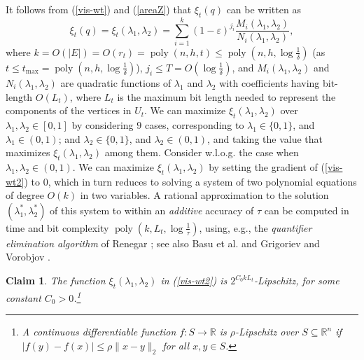 \documentclass[a4paper,11pt]{article}
\newtheorem{claim}[theorem]{Claim}
\def\RR{\mathbb R}
\def\eps{\varepsilon}
\newcommand{\raf}[1]{(\ref{#1})}
\newcommand{\poly}{\operatorname{poly}}
\begin{document}
It follows from \raf{vis-wt} and \raf{areaZ} that $\xi_t(q)$ can be written as     \begin{equation}\label{vis-wt2}                                                                                             \xi_t(q)=\xi_t(\lambda_1,\lambda_2)=\sum_{i=1}^k(1-\eps)^{j_i}\frac{M_i(\lambda_1,\lambda_2)}{N_i(\lambda_1,\lambda_2)},
\end{equation}     
where
$k=O(|E|)=O(r_t)=\poly(n,h,t)\le\poly(n,h,\log\frac{1}{\delta})$ (as $t\le t_{\max}=\poly(n,h,\log\frac{1}{\delta})$), $j_i\le T=O(\log\frac1\delta)$, and $M_i(\lambda_1,\lambda_2)$ and $N_i(\lambda_1,\lambda_2)$ are quadratic functions of $\lambda_1$ and $\lambda_2$ with coefficients having bit-length $O(L_t)$, where $L_t$ is the maximum bit length needed to represent the components of the vertices in $U_t$. We can maximize $\xi_t(\lambda_1,\lambda_2)$ over $\lambda_1,\lambda_2\in[0,1]$
by considering $9$ cases, corresponding to $\lambda_1\in\{0,1\}$, and $\lambda_1\in(0,1)$; and $\lambda_2\in\{0,1\}$, and $\lambda_2\in(0,1)$, and taking the value that maximizes $\xi_t(\lambda_1,\lambda_2)$ among them. Consider w.l.o.g. the case when $\lambda_1,\lambda_2\in(0,1)$. We can maximize $\xi_t(\lambda_1,\lambda_2)$ by setting the gradient of \raf{vis-wt2} to $0$, which in turn reduces to solving a system of two polynomial equations of degree $O(k)$ in two variables. A rational approximation to the solution $(\lambda_1^*,\lambda_2^*)$ of this system to within an {\it additive} accuracy of $\tau$ can be computed in time and bit complexity $\poly(k,L_t,\log\frac{1}{\tau})$, using, e.g., the {\em quantifier elimination algorithm} of Renegar \cite{R92}; see also Basu et al. \cite{BPR96} and Grigoriev and Vorobjov \cite{GV88}. 
\begin{claim}\label{cl4}
	The function $\xi_t(\lambda_1,\lambda_2)$ in \raf{vis-wt2} is $ 2^{C_0kL_t}$-Lipschitz, for some constant $C_0>0$.\footnote{A continuous differentiable function $f:S\to\RR$ is $\rho$-Lipschitz over $S\subseteq \RR^n$ if $|f(y)-f(x)|\le \rho\|x-y\|_2$ for all $x,y\in S$.}                                                                                                                                                                                                           
\end{claim}
\end{document}
